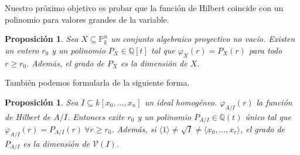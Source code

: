 \documentclass[a4paper,10pt]{book}
\newtheorem{prop}[thm]{Proposición}
\newcommand{\PP}{\mathbb P}
\newcommand{\Pnk}{\PP^n_k}
\newcommand{\VV}{{\mathcal V}}
\begin{document}
Nuestro próximo objetivo es probar que la función de Hilbert coincide con un polinomio para valores grandes de la variable.

\begin{prop}\label{existepolinomio}
Sea $X\subseteq\Pnk$ un conjunto algebraico proyectivo no vacío. Existen un entero $r_0$ y un polinomio $P_X\in {\mathbb Q}[t]$ tal que $\varphi_X(r)=P_X(r)$ para todo $r\geq r_0$. Además, el grado de $P_X$ es la dimensión de $X$.
\end{prop}
También podemos formularla de la siguiente forma.
\begin{prop}
Sea $I\subseteq k[x_0,\dots, x_n]$ un ideal homogéneo. $\varphi_{A/I}(r)$ la función de Hilbert de $A/I$. Entonces exite $r_0$ y un polinomio $P_{A/I}\in\mathbb{Q}(t)$ único tal que $\varphi_{A/I}(r)=P_{A/I}(r)\ \forall r\geq r_0$. Además, si $\langle 1\rangle \neq\sqrt{I}\neq \langle x_0,\dots, x_r\rangle$, el grado de $P_{A/I}$ es la dimensión de $\VV(I)$. 
\end{prop}
\end{document}
